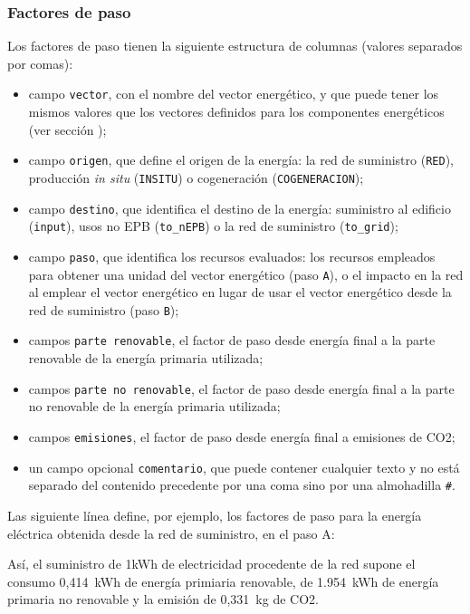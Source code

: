 \documentclass[10pt,notitlepage,oneside,a4paper]{article}
\begin{document}
\subsubsection{Factores de paso}

Los factores de paso tienen la siguiente estructura de columnas (valores separados por comas):

\begin{itemize}
\item campo \texttt{vector}, con el nombre del vector energético, y que puede tener los mismos valores que los vectores definidos para los componentes energéticos (ver sección );
\item campo \texttt{origen}, que define el origen de la energía: la red de suministro (\texttt{RED}), producción \textit{in situ} (\texttt{INSITU}) o cogeneración (\texttt{COGENERACION});
\item campo \texttt{destino}, que identifica el destino de la energía: suministro al edificio (\texttt{input}), usos no EPB (\texttt{to\_nEPB}) o la red de suministro (\texttt{to\_grid});
\item campo \texttt{paso}, que identifica los recursos evaluados: los recursos empleados para obtener una unidad del vector energético (paso \texttt{A}), o el impacto en la red al emplear el vector energético en lugar de usar el vector energético desde la red de suministro (paso \texttt{B});
\item campos \texttt{parte renovable}, el factor de paso desde energía final a la parte renovable de la energía primaria utilizada;
\item campos \texttt{parte no renovable}, el factor de paso desde energía final a la parte no renovable de la energía primaria utilizada;
\item campos \texttt{emisiones}, el factor de paso desde energía final a emisiones de CO2;
\item un campo opcional \texttt{comentario}, que puede contener cualquier texto y no está separado del contenido precedente por una coma sino por una almohadilla \texttt{\#}.
\end{itemize}

Las siguiente línea define, por ejemplo,  los factores de paso para la energía eléctrica obtenida desde la red de suministro, en el paso A:



Así, el suministro de 1kWh de electricidad procedente de la red supone el consumo 0,414~kWh de energía primiaria renovable, de 1.954~kWh de energía primaria no renovable y la emisión de 0,331~kg de CO2.
\end{document}
